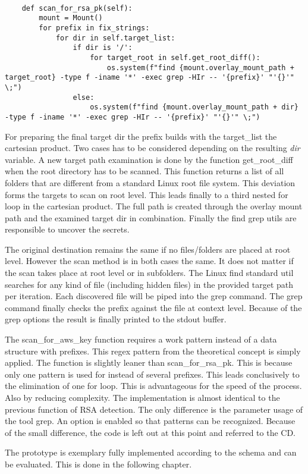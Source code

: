 \lstset{language=Python}          %
\begin{lstlisting}[]  % Start your code-block
		
    def scan_for_rsa_pk(self):
        mount = Mount()
        for prefix in fix_strings:
            for dir in self.target_list:
                if dir is '/':
                    for target_root in self.get_root_diff():
                        os.system(f"find {mount.overlay_mount_path + target_root} -type f -iname '*' -exec grep -HIr -- '{prefix}' "'{}'" \;")
                else:
                    os.system(f"find {mount.overlay_mount_path + dir} -type f -iname '*' -exec grep -HIr -- '{prefix}' "'{}'" \;")
\end{lstlisting}
For preparing the final target dir the prefix builds with the target\_list the cartesian product. 
Two cases has to be considered depending on the resulting \textit{dir} variable. A new target path examination is done by the function get\_root\_diff when the root directory has to be scanned. This function returns a list of all folders that are different from a standard Linux root file system. This deviation forms the targets to scan on root level. This leads finally to a third nested for loop in the cartesian product. The full path is created through the overlay mount path and the examined target dir in combination. Finally the find grep utils are responsible to uncover the secrets.

The original destination remains the same if no files/folders are placed at root level.
However the scan method is in both cases the same. It does not matter if the scan takes place at root level or in subfolders.
The Linux find standard util searches for any kind of file (including hidden files) in the provided target path per iteration.
Each discovered file will be piped into the grep command. The grep command finally checks the prefix against the file at context level. Because of the grep options the result is finally printed to the stdout buffer.

The scan\_for\_aws\_key function requires a work pattern instead of a data structure with prefixes. This regex pattern from the theoretical concept is simply applied.
The function is slightly leaner than scan\_for\_rsa\_pk. This is because only one pattern is used for instead of several prefixes. This leads conclusively to the elimination of one for loop.
This is advantageous for the speed of the process. Also by reducing complexity. The implementation is almost identical to the previous function of RSA detection. The only difference is the parameter usage of the tool grep. 
An option is enabled so that patterns can be recognized.
Because of the small difference, the code is left out at this point and referred to the CD.

The prototype is exemplary fully implemented according to the schema and can be evaluated. This is done in the following chapter.
	

